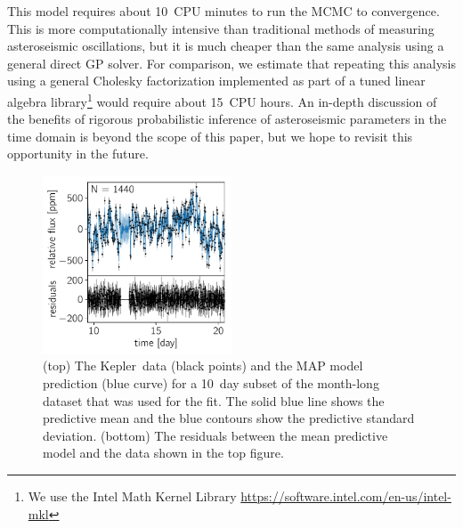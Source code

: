 \documentclass[manuscript, letterpaper]{aastex6}
\newcommand{\project}[1]{\textsf{#1}}
\newcommand{\kepler}{\project{Kepler}}
\newcommand{\figurelabel}[1]{\label{fig:#1}}
\newcommand{\response}[1]{{\color{blue}#1}}
\begin{document}
{This model requires about 10~CPU minutes to run the MCMC to convergence.
This is more computationally intensive than traditional methods of measuring
asteroseismic oscillations, but it is much cheaper than the same analysis
using a general direct GP solver.
For comparison, we estimate that repeating this analysis using a general
Cholesky factorization implemented as part of a tuned linear algebra
library\footnote{We use the Intel Math Kernel Library
\url{https://software.intel.com/en-us/intel-mkl}} would require about 15~CPU
hours.
An in-depth discussion of the benefits of rigorous probabilistic inference of
asteroseismic parameters in the time domain is beyond the scope of this paper,
but we hope to revisit this opportunity in the future.
}



\begin{figure}[!htbp]
\begin{center}
\includegraphics[width=0.5\textwidth]{figures/astero/astero.pdf}
\caption{
\response{
(top) The \kepler\ data (black points) and the MAP model
    prediction (blue curve) for a 10~day subset of the month-long dataset that
    was used for the fit.
    The solid blue line shows the predictive mean and the blue contours show
    the predictive standard deviation.
(bottom) The residuals between the mean predictive model and the data
    shown in the top figure.
}
    \figurelabel{astero}}
\end{center}
\end{figure}
\end{document}
